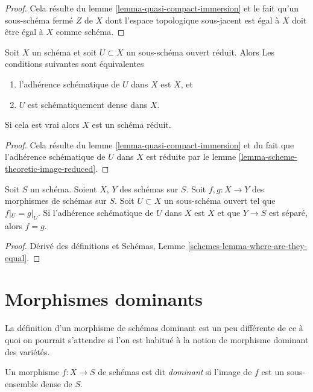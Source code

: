 \begin{proof}
Cela résulte du lemme
\ref{lemma-quasi-compact-immersion} et le fait qu'un sous-schéma
fermé $Z$ de $X$ dont l'espace topologique
sous-jacent est égal à $X$ doit être égal à $X$ comme
schéma.
\end{proof}

\begin{lemma}
\label{lemma-reduced-subscheme-closure}
Soit $X$ un schéma et soit $U \subset X$ un sous-schéma ouvert réduit. Alors Les
conditions suivantes sont équivalentes
\begin{enumerate}
\item l'adhérence schématique de $U$ dans $X$ est $X$, et
\item $U$ est schématiquement dense dans $X$.
\end{enumerate}
Si cela est vrai alors $X$ est un schéma réduit.
\end{lemma}

\begin{proof}
Cela résulte du
lemme \ref{lemma-quasi-compact-immersion} et du fait que
l'adhérence schématique de $U$ dans $X$
est
réduite par le lemme \ref{lemma-scheme-theoretic-image-reduced}.
\end{proof}


\begin{lemma}
\label{lemma-equality-of-morphisms}
Soit $S$ un schéma. Soient $X$, $Y$ des schémas
sur $S$. Soit $f, g : X \to Y$ des morphismes de schémas sur
$S$. Soit $U \subset X$ un sous-schéma ouvert tel que $f|_U = g|_U$.
Si l'adhérence schématique de $U$ dans $X$
est $X$ et que $Y \to S$ est séparé, alors $f = g$.
\end{lemma}

\begin{proof}
Dérivé des définitions
et Schémas, Lemme \ref{schemes-lemma-where-are-they-equal}.
\end{proof}




\section{Morphismes dominants}
\label{section-dominant}

\noindent
La définition d'un morphisme de schémas dominant est un peu différente
de ce à quoi on pourrait s'attendre si l'on est habitué à la notion
de morphisme dominant des variétés.

\begin{definition}
\label{definition-dominant}
Un morphisme $f : X \to S$ de schémas est dit {\it dominant} si l'image de
$f$ est un sous-ensemble dense de $S$.
\end{definition}

